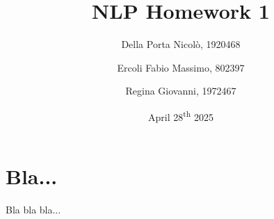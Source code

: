 \documentclass{article}
\title{NLP Homework 1}
\author{
	Della Porta Nicolò, 1920468 \\
	\and
	Ercoli Fabio Massimo, 802397 \\
	\and
	Regina Giovanni, 1972467
}
\date{April 28\textsuperscript{th} 2025}
\begin{document}
	\maketitle
	\thispagestyle{empty}
	
	\section{Bla...}
	
	\noindent Bla bla bla...
	
\end{document}
